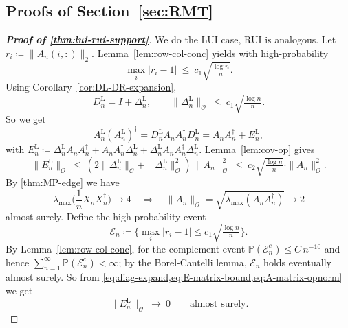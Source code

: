 \documentclass[11pt,a4paper]{article}
\newcommand{\op}{\mathcal{O}}
\newcommand{\Prob}{\mathbb{P}}
\begin{document}
\subsection{Proofs of Section~\ref{sec:RMT}}\label{sec:proofs-RMT}
\begin{proof}[\textbf{Proof of \cref{thm:lui-rui-support}}]\label{proof-of-thm1}
We do the LUI case, RUI is analogous. Let $r_i\coloneq \|A_n(i,:)\|_2$. Lemma~\ref{lem:row-col-conc} yields with high-probability
\begin{equation}
\max_i|r_i-1|\ \le\ c_1\sqrt{\tfrac{\log n}{n}}.
\end{equation}
Using Corollary~\ref{cor:DL-DR-expansion},
\begin{equation}\label{eq:diag-expand}
D^\mathrm{L}_{n}=I+\Delta^\mathrm{L}_{n},\qquad
\|\Delta^\mathrm{L}_{n}\|_{\op}\ \le\ c_1\sqrt{\tfrac{\log n}{n}}.
\end{equation}
So we get
\begin{equation}
A^\mathrm{L}_n(A^\mathrm{L}_n)^\dagger
= D^\mathrm{L}_{n}A_nA_n^\dagger D^\mathrm{L}_{n}
= A_nA_n^\dagger + E^\mathrm{L}_n,
\end{equation}
with $E^\mathrm{L}_n\coloneq \Delta^\mathrm{L}_{n}A_nA_n^\dagger + A_nA_n^\dagger\Delta^\mathrm{L}_{n} + \Delta^\mathrm{L}_{n}A_nA_n^\dagger\Delta^\mathrm{L}_{n}$. Lemma~\ref{lem:cov-op} gives
\begin{equation}\label{eq:E-matrix-bound}
\|E^\mathrm{L}_n\|_{\op}\ \le\ (2\|\Delta^\mathrm{L}_{n}\|_{\op}+\|\Delta^\mathrm{L}_{n}\|_{\op}^2)\,\|A_n\|_{\op}^2
\ \le\ c_2\sqrt{\tfrac{\log n}{n}}\cdot \|A_n\|_{\op}^2.
\end{equation}
By \cref{thm:MP-edge} we have
\begin{equation}\label{eq:A-matrix-opnorm}
\lambda_{\max}\!\Big(\frac1n X_nX_n^\dagger\Big)\to 4\quad\Longrightarrow\quad \|A_n\|_{\op}=\sqrt{\lambda_{\max}(A_nA_n^\dagger)}\to 2
\end{equation}
almost surely. Define the high-probability event
\begin{equation}
\mathcal E_n\coloneq \Big\{\max_i|r_i-1|\le c_1\sqrt{\tfrac{\log n}{n}}\Big\}.
\end{equation}
By Lemma~\ref{lem:row-col-conc}, for the complement event $\Prob(\mathcal E_n^c)\le C\,n^{-10}$ and hence $\sum_{n=1}^\infty \Prob(\mathcal E_n^c)<\infty$; by the Borel-Cantelli lemma,
$\mathcal E_n$ holds eventually almost surely. So from \cref{eq:diag-expand,eq:E-matrix-bound,eq:A-matrix-opnorm} we get 
\begin{equation}
\|E^\mathrm{L}_n\|_{\op}\ \longrightarrow\ 0\qquad\text{almost surely}.

\end{equation}
\end{proof}
\end{document}
